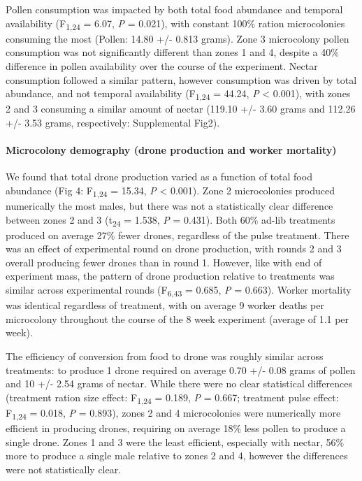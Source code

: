 \documentclass[11pt,]{article}
\let\oldparagraph\paragraph
\renewcommand{\paragraph}[1]{\oldparagraph{#1}\mbox{}}
\begin{document}
Pollen consumption was impacted by both total food abundance and
temporal availability (F\textsubscript{1,24} = 6.07, \emph{P} = 0.021),
with constant 100\% ration microcolonies consuming the most (Pollen:
14.80 +/- 0.813 grams). Zone 3 microcolony pollen consumption was not
significantly different than zones 1 and 4, despite a 40\% difference in
pollen availability over the course of the experiment. Nectar
consumption followed a similar pattern, however consumption was driven
by total abundance, and not temporal availability (F\textsubscript{1,24}
= 44.24, \emph{P} \textless{} 0.001), with zones 2 and 3 consuming a
similar amount of nectar (119.10 +/- 3.60 grams and 112.26 +/- 3.53
grams, respectively: Supplemental Fig2).

\hypertarget{microcolony-demography-drone-production-and-worker-mortality}{%
\paragraph{Microcolony demography (drone production and worker
mortality)}\label{microcolony-demography-drone-production-and-worker-mortality}}

We found that total drone production varied as a function of total food
abundance (Fig 4: F\textsubscript{1,24} = 15.34, \emph{P} \textless{}
0.001). Zone 2 microcolonies produced numerically the most males, but
there was not a statistically clear difference between zones 2 and 3
(t\textsubscript{24} = 1.538, \emph{P} = 0.431). Both 60\% ad-lib
treatments produced on average 27\% fewer drones, regardless of the
pulse treatment. There was an effect of experimental round on drone
production, with rounds 2 and 3 overall producing fewer drones than in
round 1. However, like with end of experiment mass, the pattern of drone
production relative to treatments was similar across experimental rounds
(F\textsubscript{6,43} = 0.685, \emph{P} = 0.663). Worker mortality was
identical regardless of treatment, with on average 9 worker deaths per
microcolony throughout the course of the 8 week experiment (average of
1.1 per week).

The efficiency of conversion from food to drone was roughly similar
across treatments: to produce 1 drone required on average 0.70 +/- 0.08
grams of pollen and 10 +/- 2.54 grams of nectar. While there were no
clear statistical differences (treatment ration size effect:
F\textsubscript{1,24} = 0.189, \emph{P} = 0.667; treatment pulse effect:
F\textsubscript{1,24} = 0.018, \emph{P} = 0.893), zones 2 and 4
microcolonies were numerically more efficient in producing drones,
requiring on average 18\% less pollen to produce a single drone. Zones 1
and 3 were the least efficient, especially with nectar, 56\% more to
produce a single male relative to zones 2 and 4, however the differences
were not statistically clear.
\end{document}
